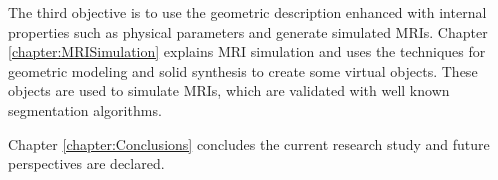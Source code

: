 The third objective is to use
the geometric description enhanced 
with internal properties such as physical parameters
and generate simulated MRIs.
Chapter \ref{chapter:MRISimulation} explains MRI simulation and 
uses the techniques for geometric modeling and
solid synthesis to create some virtual objects.
These objects are used to simulate MRIs, which are
validated with well known segmentation algorithms. 

Chapter \ref{chapter:Conclusions} concludes the current research study 
and future perspectives are declared. 


\newpage